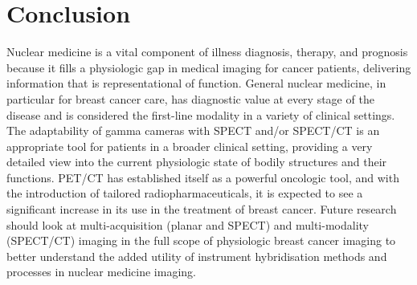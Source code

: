 \documentclass{article}
\begin{document}
\section{Conclusion}
Nuclear medicine is a vital component of illness diagnosis, therapy, and prognosis because it 
fills a physiologic gap in medical imaging for cancer patients, delivering information that is 
representational of function.
General nuclear medicine, in particular for breast cancer care, has diagnostic value at every 
stage of the disease and is considered the first-line modality in a variety of clinical settings. 
The adaptability of gamma cameras with SPECT and/or SPECT/CT is an appropriate tool for 
patients in a broader clinical setting, providing a very detailed view into the current 
physiologic state of bodily structures and their functions. PET/CT has established itself as a 
powerful oncologic tool, and with the introduction of tailored radiopharmaceuticals, it is 
expected to see a significant increase in its use in the treatment of breast cancer.
Future research should look at multi-acquisition (planar and SPECT) and multi-modality 
(SPECT/CT) imaging in the full scope of physiologic breast cancer imaging to better 
understand the added utility of instrument hybridisation methods and processes in nuclear 
medicine imaging.
\end{document}

